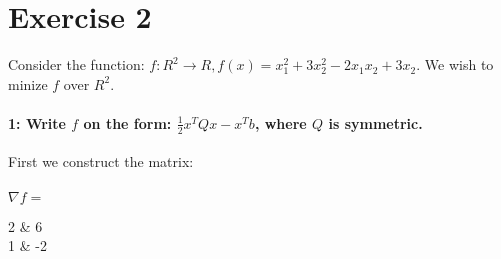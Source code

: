 \documentclass[Main]{subfiles}
\begin{document}
\section*{Exercise 2}
Consider the function: $f:R^2 \rightarrow R, f(x) = x_1^2 + 3x_2^2 - 2x_1x_2 + 3x_2$. We wish to minize $f$ over $R^2$.
\paragraph{1: Write $f$ on the form: $\frac{1}{2} x^T Qx-x^Tb$, where $Q$ is symmetric.}


First we construct the matrix:
\\\\
$\nabla f =$
\begin{ArgMat}
2 & 6 \\
1 & -2
\end{ArgMat}
\end{document}
